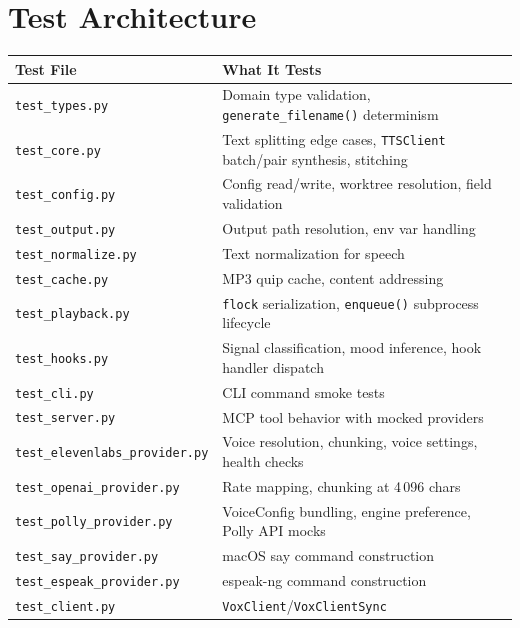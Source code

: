 \documentclass[a4paper,10pt]{article}
\begin{document}
\section{Test Architecture}

\begin{center}
\begin{tabular}{lp{7cm}}
\toprule
\textbf{Test File} & \textbf{What It Tests} \\
\midrule
\texttt{test\_types.py}             & Domain type validation,
  \texttt{generate\_filename()} determinism \\
\texttt{test\_core.py}              & Text splitting edge cases,
  \texttt{TTSClient} batch/pair synthesis, stitching \\
\texttt{test\_config.py}            & Config read/write, worktree
  resolution, field validation \\
\texttt{test\_output.py}            & Output path resolution, env
  var handling \\
\texttt{test\_normalize.py}          & Text normalization for speech \\
\texttt{test\_cache.py}             & MP3 quip cache, content addressing \\
\texttt{test\_playback.py}          & \texttt{flock} serialization,
  \texttt{enqueue()} subprocess lifecycle \\
\texttt{test\_hooks.py}             & Signal classification, mood
  inference, hook handler dispatch \\
\texttt{test\_cli.py}               & CLI command smoke tests \\
\texttt{test\_server.py}            & MCP tool behavior with mocked
  providers \\
\texttt{test\_elevenlabs\_provider.py} & Voice resolution, chunking,
  voice settings, health checks \\
\texttt{test\_openai\_provider.py}  & Rate mapping, chunking at 4\,096
  chars \\
\texttt{test\_polly\_provider.py}   & VoiceConfig bundling, engine
  preference, Polly API mocks \\
\texttt{test\_say\_provider.py}     & macOS say command construction \\
\texttt{test\_espeak\_provider.py}  & espeak-ng command construction \\
\texttt{test\_client.py}            & \texttt{VoxClient}/\texttt{VoxClientSync}

\end{tabular}
\end{center}
\end{document}
